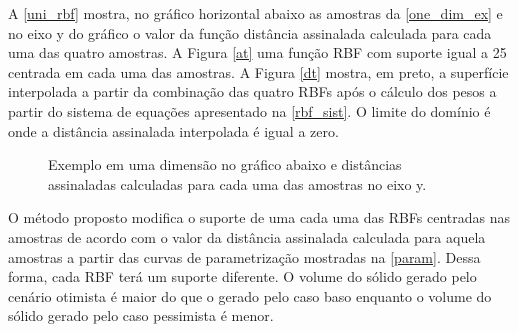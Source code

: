 A \autoref{uni_rbf} mostra, no gráfico horizontal abaixo as amostras da \autoref{one_dim_ex} e no eixo y do gráfico o valor da função distância assinalada calculada para cada uma das quatro amostras. A Figura \autoref{at} uma função RBF com suporte igual a 25 centrada em cada uma das amostras. A Figura \autoref{dt} mostra, em preto, a superfície interpolada a partir da combinação das quatro RBFs após o cálculo dos pesos a partir do sistema de equações apresentado na \autoref{rbf_sist}. O limite do domínio é onde a distância assinalada interpolada é igual a zero.

\begin{figure}[H] 
    \centering
    \caption{Exemplo em uma dimensão no gráfico abaixo e distâncias assinaladas calculadas para cada uma das amostras no eixo y.} \label{uni_rbf}
     \hspace{1em}
\end{figure}

O método proposto modifica o suporte de uma cada uma das RBFs centradas nas amostras de acordo com o valor da distância assinalada calculada para aquela amostras a partir das curvas de parametrização mostradas na \autoref{param}. Dessa forma, cada RBF terá um suporte diferente. O volume do sólido gerado pelo cenário otimista é maior do que o gerado pelo caso baso enquanto o volume do sólido gerado pelo caso pessimista é menor.

